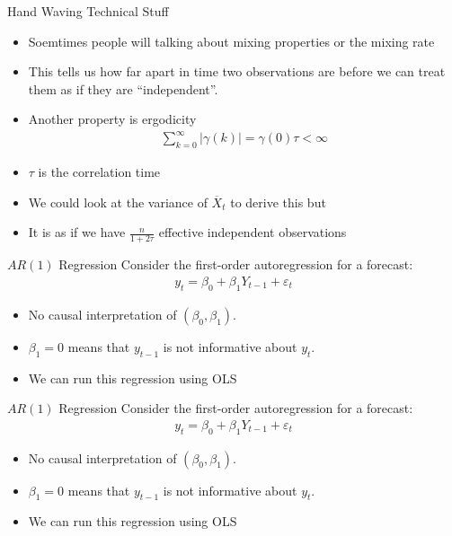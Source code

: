 \documentclass[aspectratio=169]{beamer}
\begin{document}
\begin{frame}{Hand Waving Technical Stuff}
\begin{itemize}
\item Soemtimes people will talking about \alert{mixing properties} or the \alert{mixing rate}
\item This tells us how far apart in time two observations are before we can treat them as if they are ``independent''.
\item Another property is \alert{ergodicity}
\begin{align*}
\sum_{k=0}^{\infty} | \gamma(k)|  = \gamma(0) \tau < \infty
\end{align*}
\item $\tau$ is the \alert{correlation} time
\item We could look at the variance of $\overline{X}_t$ to derive this but
\item It is as if we have $\frac{n}{1+ 2\tau}$ \alert{effective independent observations}
\end{itemize}
\end{frame}

\begin{frame}{$AR(1)$ Regression}
Consider the first-order autoregression for a \alert{forecast}:
\begin{align*}
y_t = \beta_0 + \beta_1 Y_{t-1} + \varepsilon_t
\end{align*}
\begin{itemize}
    \item No causal interpretation of $(\beta_0,\beta_1)$.
    \item $\beta_1=0$ means that $y_{t-1}$ is not informative about $y_t$.
    \item We can run this regression using OLS
\end{itemize}
\end{frame}

\begin{frame}{$AR(1)$ Regression}
Consider the first-order autoregression for a \alert{forecast}:
\begin{align*}
y_t = \beta_0 + \beta_1 Y_{t-1} + \varepsilon_t
\end{align*}
\begin{itemize}
    \item No causal interpretation of $(\beta_0,\beta_1)$.
    \item $\beta_1=0$ means that $y_{t-1}$ is not informative about $y_t$.
    \item We can run this regression using OLS
\end{itemize}
\end{frame}
\end{document}
